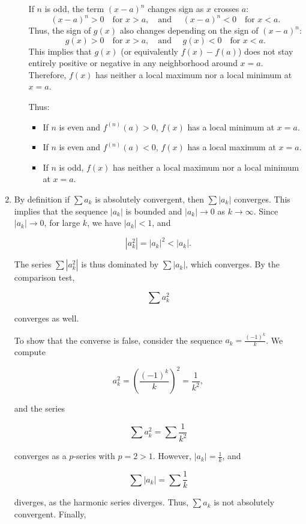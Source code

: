 \documentclass[12pt]{article}
\begin{document}
\begin{enumerate}
\begin{enumerate}
If \(n\) is odd, the term \((x-a)^n\) changes sign as \(x\) crosses \(a\):
\[
(x-a)^n > 0 \quad \text{for } x > a, \quad \text{and } \quad (x-a)^n < 0 \quad \text{for } x < a.
\]
Thus, the sign of \(g(x)\) also changes depending on the sign of \((x-a)^n\):
\[
g(x) > 0 \quad \text{for } x > a, \quad \text{and } \quad g(x) < 0 \quad \text{for } x < a.
\]
This implies that \(g(x)\) (or equivalently \(f(x) - f(a)\)) does not stay entirely positive or negative in any neighborhood around \(x = a\). Therefore, \(f(x)\) has neither a local maximum nor a local minimum at \(x = a\).

Thus:
\begin{itemize}
    \item If \(n\) is even and \(f^{(n)}(a) > 0\), \(f(x)\) has a local minimum at \(x = a\).
    \item If \(n\) is even and \(f^{(n)}(a) < 0\), \(f(x)\) has a local maximum at \(x = a\).
    \item If \(n\) is odd, \(f(x)\) has neither a local maximum nor a local minimum at \(x = a\).
\end{itemize}

\end{enumerate}

\item 
By definition if \(\sum a_k\) is absolutely convergent, then \(\sum |a_k|\) converges. This implies that the sequence \(|a_k|\) is bounded and \(|a_k| \to 0\) as \(k \to \infty\). Since \(|a_k| \to 0\), for large \(k\), we have \(|a_k| < 1\), and 

\[
|a_k^2| = |a_k|^2 < |a_k|.
\]

The series \(\sum |a_k^2|\) is thus dominated by \(\sum |a_k|\), which converges. By the comparison test, 

\[
\sum a_k^2
\]

converges as well.

To show that the converse is false, consider the sequence \(a_k = \frac{(-1)^k}{k}\). We compute 

\[
a_k^2 = \left(\frac{(-1)^k}{k}\right)^2 = \frac{1}{k^2},
\]

and the series 

\[
\sum a_k^2 = \sum \frac{1}{k^2}
\]

converges as a \(p\)-series with \(p = 2 > 1\). However, \(|a_k| = \frac{1}{k}\), and 

\[
\sum |a_k| = \sum \frac{1}{k}
\]

diverges, as the harmonic series diverges. Thus, \(\sum a_k\) is not absolutely convergent. Finally, 


\end{enumerate}
\end{document}
